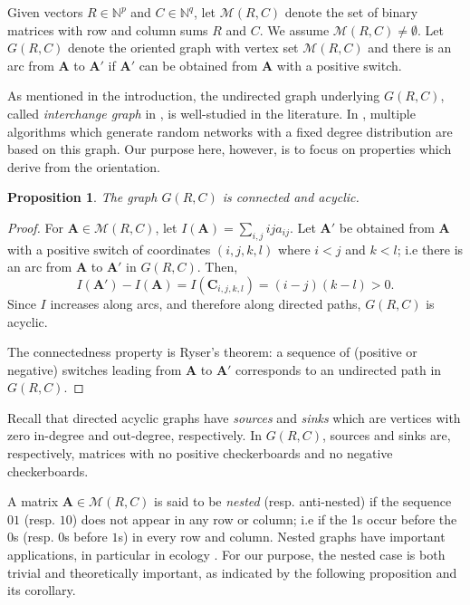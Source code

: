 \documentclass{article}
\newtheorem{prop}{Proposition}
\newcommand{\N}{\mathbb{N}}
\newcommand{\MM}{\mathcal M}
\newcommand{\A}{\mathbf A}
\newcommand{\C}{\mathbf C}
\begin{document}
Given vectors $R\in \N^p$ and $C\in \N^q$, let $\MM(R,C)$ denote the set of binary matrices with row and column sums $R$ and $C$. We assume $\MM(R,C)\neq\emptyset$. Let $G(R,C)$ denote the oriented graph with vertex set $\MM(R,C)$ and there is an arc from $\A$ to $\A'$ if $\A'$ can be obtained from $\A$ with a positive switch.


As mentioned in the introduction, the undirected graph underlying $G(R,C)$, called \emph{interchange graph} in \cite{brualdi1980matrices}, is well-studied in the literature. In \cite{artzy2005generating}, multiple algorithms which generate random networks with a fixed degree distribution are based on this graph. Our purpose here, however, is to focus on properties which derive from the orientation.

\begin{prop}\label{acyclic}
The graph $G(R,C)$ is connected and acyclic.
\end{prop}

\begin{proof}
For $\A\in\MM(R,C)$, let $I(\A)=\sum_{i,j}ija_{ij}$. Let $\A'$ be obtained from $\A$ with a positive switch of coordinates $(i,j,k,l)$ where $i<j$ and $k<l$; i.e there is an arc from $\A$ to $\A'$ in $G(R,C)$. Then, $$I(\A')-I(\A)=I(\C_{i,j,k,l})=(i-j)(k-l)>0.$$ Since $I$ increases along arcs, and therefore along directed paths, $G(R,C)$ is acyclic. 

The connectedness property is Ryser's theorem: a sequence of (positive or negative) switches leading from $\A$ to $\A'$ corresponds to an undirected path in $G(R,C)$.
\end{proof}





Recall that directed acyclic graphs have \emph{sources} and \emph{sinks} which are vertices with zero in-degree and out-degree, respectively. In $G(R,C)$, sources and sinks are, respectively, matrices with no positive checkerboards and no negative checkerboards.


A matrix $\A\in\MM(R,C)$ is said to be \emph{nested} (resp. anti-nested) if the sequence $01$ (resp. $10$) does not appear in any row or column; i.e if the 1s occur before the $0$s (resp. $0$s before $1$s) in every row and column. Nested graphs have important applications, in particular in ecology \cite{brualdi1999nested}. For our purpose, the nested case is both trivial  and theoretically important, as indicated by the following proposition and its corollary.
\end{document}
